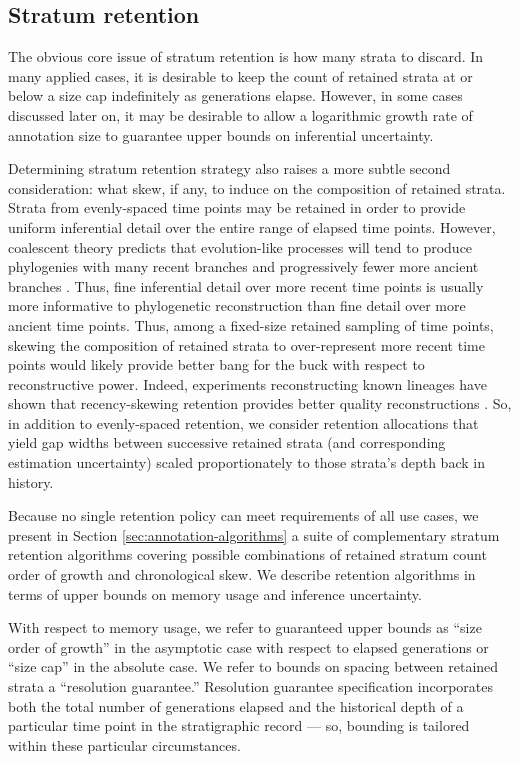 \subsection{Stratum retention}

The obvious core issue of stratum retention is how many strata to discard.
In many applied cases, it is desirable to keep the count of retained strata at or below a size cap indefinitely as generations elapse.
However, in some cases discussed later on, it may be desirable to allow a logarithmic growth rate of annotation size to guarantee upper bounds on inferential uncertainty.

Determining stratum retention strategy also raises a more subtle second consideration: what skew, if any, to induce on the composition of retained strata.
Strata from evenly-spaced time points may be retained in order to provide uniform inferential detail over the entire range of elapsed time points.
However, coalescent theory predicts that evolution-like processes will tend to produce phylogenies with many recent branches and progressively fewer more ancient branches \citep{nordborgCoalescentTheory2019, berestyckiRecentProgressCoalescent2009}.
Thus, fine inferential detail over more recent time points is usually more informative to phylogenetic reconstruction than fine detail over more ancient time points.
Thus, among a fixed-size retained sampling of time points, skewing the composition of retained strata to over-represent more recent time points would likely provide better bang for the buck with respect to reconstructive power.
Indeed, experiments reconstructing known lineages have shown that recency-skewing retention provides better quality reconstructions \citep{moreno2022hereditary}.
So, in addition to evenly-spaced retention, we consider retention allocations that yield gap widths between successive retained strata (and corresponding estimation uncertainty) scaled proportionately to those strata's depth back in history.

Because no single retention policy can meet requirements of all use cases, we present in Section \ref{sec:annotation-algorithms} a suite of complementary stratum retention algorithms covering possible combinations of retained stratum count order of growth and chronological skew.
We describe retention algorithms in terms of upper bounds on memory usage and inference uncertainty.

With respect to memory usage, we refer to guaranteed upper bounds as ``size order of growth'' in the asymptotic case with respect to elapsed generations or ``size cap'' in the absolute case.
We refer to bounds on spacing between retained strata a ``resolution guarantee.''
Resolution guarantee specification incorporates both the total number of generations elapsed and the historical depth of a particular time point in the stratigraphic record --- so, bounding is tailored within these particular circumstances.

